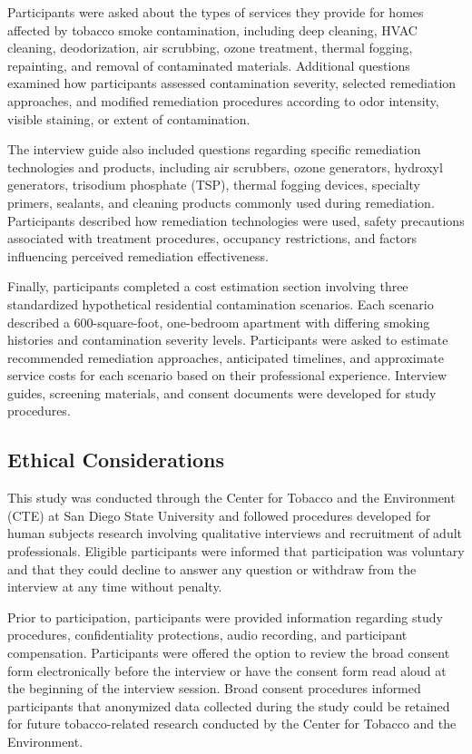 \documentclass[stu]{apa7}
\begin{document}
Participants were asked about the types of services they provide for homes affected by tobacco smoke contamination, including deep cleaning, HVAC cleaning, deodorization, air scrubbing, ozone treatment, thermal fogging, repainting, and removal of contaminated materials. Additional questions examined how participants assessed contamination severity, selected remediation approaches, and modified remediation procedures according to odor intensity, visible staining, or extent of contamination.

The interview guide also included questions regarding specific remediation technologies and products, including air scrubbers, ozone generators, hydroxyl generators, trisodium phosphate (TSP), thermal fogging devices, specialty primers, sealants, and cleaning products commonly used during remediation. Participants described how remediation technologies were used, safety precautions associated with treatment procedures, occupancy restrictions, and factors influencing perceived remediation effectiveness.

Finally, participants completed a cost estimation section involving three standardized hypothetical residential contamination scenarios. Each scenario described a 600-square-foot, one-bedroom apartment with differing smoking histories and contamination severity levels. Participants were asked to estimate recommended remediation approaches, anticipated timelines, and approximate service costs for each scenario based on their professional experience. Interview guides, screening materials, and consent documents were developed for study procedures.

\subsection{Ethical Considerations}

This study was conducted through the Center for Tobacco and the Environment (CTE) at San Diego State University and followed procedures developed for human subjects research involving qualitative interviews and recruitment of adult professionals. Eligible participants were informed that participation was voluntary and that they could decline to answer any question or withdraw from the interview at any time without penalty.

Prior to participation, participants were provided information regarding study procedures, confidentiality protections, audio recording, and participant compensation. Participants were offered the option to review the broad consent form electronically before the interview or have the consent form read aloud at the beginning of the interview session. Broad consent procedures informed participants that anonymized data collected during the study could be retained for future tobacco-related research conducted by the Center for Tobacco and the Environment.
\end{document}
